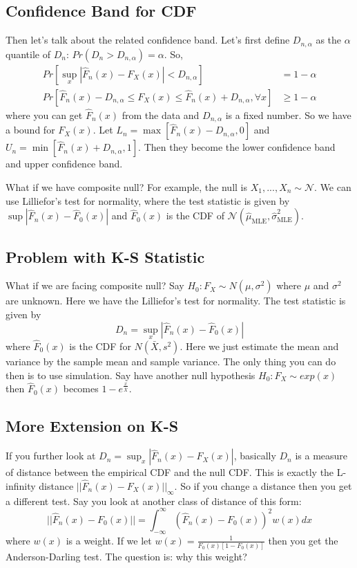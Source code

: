 \documentclass[twoside]{article}
\begin{document}
\subsection{Confidence Band for CDF}
Then let's talk about the related confidence band. Let's first define $D_{n, \alpha}$ as the $\alpha$ quantile of $D_n$: $Pr \left( D_n > D_{n, \alpha} \right) = \alpha$. So, 
\begin{align*}
	Pr \left[ \sup_{x} |\hat{F}_n (x) - F_X (x)| < D_{n, \alpha} \right] &= 1 - \alpha \\
	Pr \left[ \hat{F}_n (x) - D_{n, \alpha} \leqslant F_X (x) \leqslant \hat{F}_n (x) + D_{n, \alpha}, \forall x \right] &\geqslant 1 - \alpha
\end{align*}
where you can get $\hat{F}_n (x)$ from the data and $D_{n, \alpha}$ is a fixed number. So we have a bound for $F_X(x)$. Let $L_n = \max \left[ \hat{F}_n (x) - D_{n, \alpha}, 0 \right]$ and $U_n = \min \left[ \hat{F}_n(x) + D_{n, \alpha}, 1 \right]$. Then they become the lower confidence band and upper confidence band. 

What if we have composite null? For example, the null is $X_1, ..., X_n \sim \mathcal{N}$. We can use Lilliefor's test for normality, where the test statistic is given by $\sup |\hat{F}_n (x) - \hat{F}_0 (x)|$ and $\hat{F}_0(x)$ is the CDF of $\mathcal{N}(\hat{\mu}_{\mathrm{MLE}}, \hat{\sigma}^2_{\mathrm{MLE}})$.


\subsection{Problem with K-S Statistic}
What if we are facing composite null? Say $H_0: F_X \sim N(\mu, \sigma^2)$ where $\mu$ and $\sigma^2$ are unknown. Here we have the Lilliefor's test for normality. The test statistic is given by
$$
D_n = \sup_{x} |\hat{F}_n(x) - \hat{F}_0 (x)|
$$
where $\hat{F}_0 (x)$ is the CDF for $N( \bar{X}, s^2 )$. Here we just estimate the mean and variance by the sample mean and sample variance. The only thing you can do then is to use simulation. Say have another null hypothesis $H_0: F_X \sim exp(x)$ then $\hat{F}_0 (x)$ becomes $1 - e^{\frac{x}{\bar{X}}}$. 

\subsection{More Extension on K-S}
If you further look at $D_n = \sup_x |\hat{F}_n (x) - F_X(x)|$, basically $D_n$ is a measure of distance between the empirical CDF and the null CDF. This is exactly the L-infinity distance $||\hat{F}_n (x) - F_X(x)||_{\infty}$. So if you change a distance then you get a different test. Say you look at another class of distance of this form: 
$$
||\hat{F}_n (x) - F_0(x)|| = \int_{- \infty}^{\infty} \left( \hat{F}_n(x) - F_0(x) \right)^2 w(x) dx
$$
where $w(x)$ is a weight. If we let $w(x) = \frac{1}{F_0(x) [1 - F_0(x)]}$ then you get the Anderson-Darling test. The question is: why this weight? 
\end{document}
